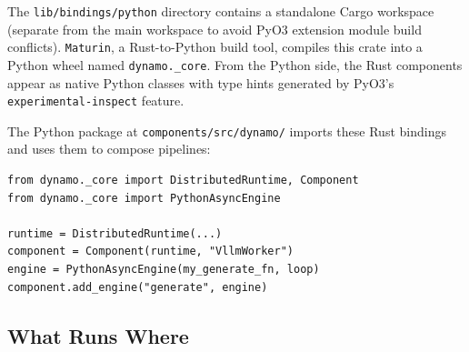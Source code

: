 The \texttt{lib/bindings/python} directory contains a standalone Cargo workspace (separate from the main workspace to avoid PyO3 extension module build conflicts). \texttt{Maturin}, a Rust-to-Python build tool, compiles this crate into a Python wheel named \texttt{dynamo.\_core}. From the Python side, the Rust components appear as native Python classes with type hints generated by PyO3's \texttt{experimental-inspect} feature.

The Python package at \texttt{components/src/dynamo/} imports these Rust bindings and uses them to compose pipelines:

\begin{verbatim}
from dynamo._core import DistributedRuntime, Component
from dynamo._core import PythonAsyncEngine

runtime = DistributedRuntime(...)
component = Component(runtime, "VllmWorker")
engine = PythonAsyncEngine(my_generate_fn, loop)
component.add_engine("generate", engine)
\end{verbatim}

\subsection{What Runs Where}

